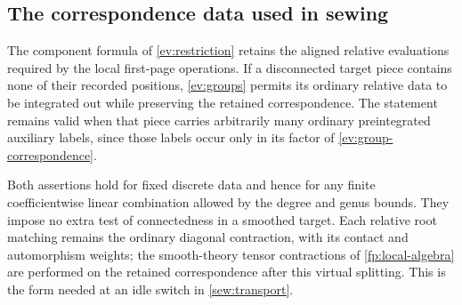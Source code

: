 \subsection{The correspondence data used in sewing}

The component formula of \cref{ev:restriction} retains the aligned
relative evaluations required by the local first-page operations.
If a disconnected target piece contains none of their recorded
positions, \cref{ev:groups} permits its ordinary relative data to
be integrated out while preserving the retained correspondence.
The statement remains valid when that piece carries arbitrarily
many ordinary preintegrated auxiliary labels, since those labels
occur only in its factor of \eqref{ev:group-correspondence}.

Both assertions hold for fixed discrete data and hence for any
finite coefficientwise linear combination allowed by the degree
and genus bounds.  They impose no extra test of connectedness in
a smoothed target.  Each relative root matching remains the
ordinary diagonal contraction, with its contact and automorphism
weights; the smooth-theory tensor contractions of
\cref{fp:local-algebra} are performed on the retained correspondence
after this virtual splitting.  This is the form needed at an idle
switch in \cref{sew:transport}.
